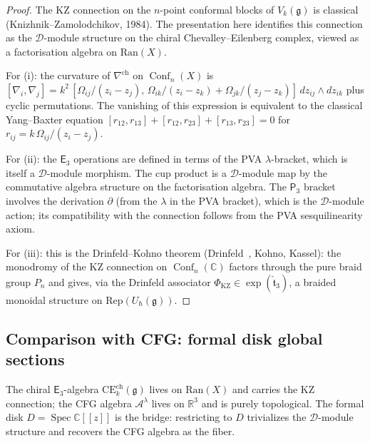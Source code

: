 \documentclass[11pt,reqno]{amsart}
\theoremstyle{definition}
\theoremstyle{remark}
\newcommand{\cA}{\mathcal{A}}
\newcommand{\cD}{\mathcal{D}}
\newcommand{\Ran}{\mathrm{Ran}}
\newcommand{\CE}{\mathrm{CE}}
\newcommand{\Ethree}{\mathsf{E}_{3}}
\newcommand{\Pthree}{\mathsf{P}_{3}}
\DeclareMathOperator{\Conf}{Conf}
\DeclareMathOperator{\Spec}{Spec}
\newcommand{\fg}{\mathfrak{g}}
\newcommand{\CC}{\mathbb{C}}
\newcommand{\RR}{\mathbb{R}}
\numberwithin{equation}{section}
\begin{document}
\begin{proof}
The KZ connection on the $n$-point conformal blocks of
$V_k(\fg)$ is classical (Knizhnik--Zamolodchikov, 1984).
The presentation here identifies this connection as the
$\cD$-module structure on the chiral Chevalley--Eilenberg
complex, viewed as a factorisation algebra on $\Ran(X)$.

For (i): the curvature of $\nabla^{\mathrm{ch}}$ on
$\Conf_n(X)$ is
$[\nabla_i, \nabla_j]
= k^2\,[\Omega_{ij}/(z_i-z_j),\,
\Omega_{ik}/(z_i-z_k) + \Omega_{jk}/(z_j-z_k)]
\,dz_{ij} \wedge dz_{ik}$
plus cyclic permutations. The vanishing of this expression
is equivalent to the classical Yang--Baxter equation
$[r_{12}, r_{13}] + [r_{12}, r_{23}] + [r_{13}, r_{23}] = 0$
for $r_{ij} = k\,\Omega_{ij}/(z_i - z_j)$.

For (ii): the $\Ethree$ operations are defined in terms of
the PVA $\lambda$-bracket, which is itself a $\cD$-module
morphism. The cup product is a $\cD$-module map by the
commutative algebra structure on the factorisation algebra.
The $\Pthree$ bracket involves the derivation $\partial$
(from the $\lambda$ in the PVA bracket), which is the
$\cD$-module action; its compatibility with the connection
follows from the PVA sesquilinearity axiom.

For (iii): this is the Drinfeld--Kohno theorem
(Drinfeld~\cite{EK96}, Kohno, Kassel): the monodromy of the
KZ connection on $\Conf_n(\CC)$ factors through the pure
braid group $P_n$ and gives, via the Drinfeld associator
$\Phi_{\mathrm{KZ}} \in \exp(\hat{\mathfrak{t}}_3)$,
a braided monoidal structure on $\mathrm{Rep}(U_\hbar(\fg))$.
\end{proof}

\subsection{Comparison with CFG: formal disk global sections}
\label{subsec:chiral-e3-cfg-comparison}

The chiral $\Ethree$-algebra
$\CE^{\mathrm{ch}}_k(\fg)$ lives on $\Ran(X)$ and
carries the KZ connection; the CFG algebra $\cA^\lambda$
lives on $\RR^3$ and is purely topological. The formal
disk $D = \Spec \CC[[z]]$ is the bridge: restricting to
$D$ trivializes the $\cD$-module structure and recovers the
CFG algebra as the fiber.
\end{document}
